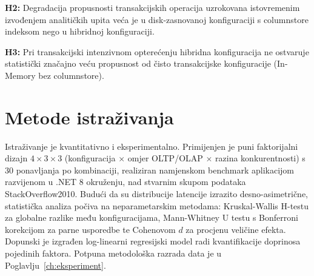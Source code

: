 \textbf{H2:} Degradacija propusnosti transakcijskih operacija uzrokovana istovremenim izvođenjem analitičkih upita veća je u disk-zasnovanoj konfiguraciji s columnstore indeksom nego u hibridnoj konfiguraciji.

\textbf{H3:} Pri transakcijski intenzivnom opterećenju hibridna konfiguracija ne ostvaruje statistički značajno veću propusnost od čisto transakcijske konfiguracije (In-Memory bez columnstore).

\section{Metode istraživanja}
\label{sec:metode}

Istraživanje je kvantitativno i eksperimentalno. Primijenjen je puni faktorijalni dizajn $4\times3\times3$ (konfiguracija $\times$ omjer OLTP/OLAP $\times$ razina konkurentnosti) s 30 ponavljanja po kombinaciji, realiziran namjenskom benchmark aplikacijom razvijenom u .NET 8 okruženju, nad stvarnim skupom podataka StackOverflow2010. Budući da su distribucije latencije izrazito desno-asimetrične, statistička analiza počiva na neparametarskim metodama: Kruskal-Wallis H-testu za globalne razlike među konfiguracijama, Mann-Whitney U testu s Bonferroni korekcijom za parne usporedbe te Cohenovom $d$ za procjenu veličine efekta. Dopunski je izgrađen log-linearni regresijski model radi kvantifikacije doprinosa pojedinih faktora. Potpuna metodološka razrada data je u Poglavlju~\ref{ch:eksperiment}.
